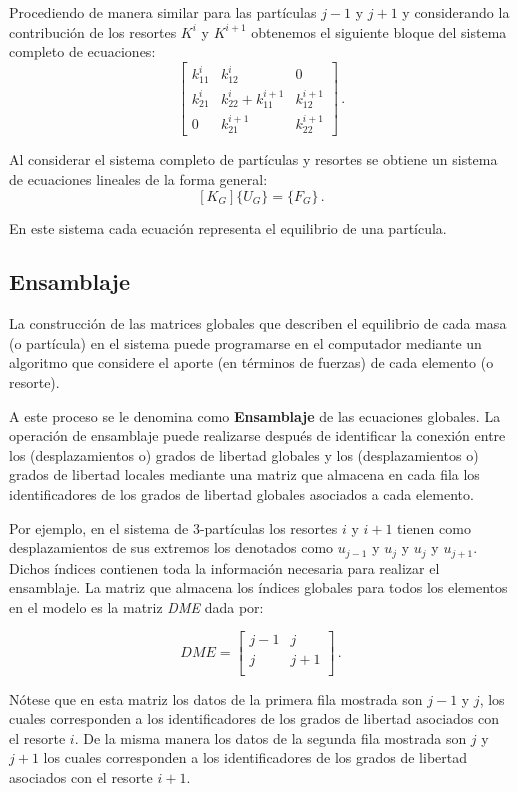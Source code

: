 Procediendo de manera similar para las partículas ${j-1}$ y ${j+1}$ y 
considerando la contribución de los resortes $K^i$ y $K^{i+1}$ obtenemos el 
siguiente bloque del sistema completo de ecuaciones:
$$\begin{bmatrix}
k_{11}^i &k_{12}^i &0\\
k_{21}^i &k_{22}^i + k_{11}^{i + 1} &k_{12}^{i + 1}\\
0 &k_{21}^{i + 1} &k_{22}^{i + 1}
\end{bmatrix}\, . $$

Al considerar el sistema completo de partículas y resortes se obtiene un 
sistema de ecuaciones lineales de la forma general:
$$
[K_G] \{U_G\}  = \{F_G\}\, .
$$

En este sistema cada ecuación representa el equilibrio de una partícula.

\subsection{Ensamblaje}
La construcción de las matrices globales que describen el equilibrio de cada 
masa (o partícula) en el sistema puede programarse en el computador mediante un 
algoritmo que considere el aporte (en términos de fuerzas) de cada elemento (o 
resorte).

A este proceso se le denomina como \textbf{Ensamblaje} de las ecuaciones 
globales. La operación de ensamblaje puede realizarse después de identificar la 
conexión entre los (desplazamientos o) grados de libertad globales y los 
(desplazamientos o) grados de libertad locales mediante una matriz que almacena 
en cada fila los identificadores de los grados de libertad globales asociados a 
cada elemento.

Por ejemplo, en el sistema de 3-partículas los resortes $i$ y $i+1$ tienen como 
desplazamientos de sus extremos los denotados como $u_{j-1}$ y $u_j$ y $u_j$ y 
$u_{j+1}$. Dichos índices contienen toda la información necesaria para realizar 
el ensamblaje. La matriz que almacena los índices globales para todos los 
elementos en el modelo es la matriz \textit{DME} dada por:

$$ DME = \begin{bmatrix}
j - 1 &j\\
j &j + 1\\
\end{bmatrix}\, .$$

Nótese que en esta matriz los datos de la primera fila mostrada son $j - 1$ y 
$j$, los cuales corresponden a los identificadores de los grados de libertad 
asociados con el resorte $i$. De la misma manera los datos de la segunda fila 
mostrada son $j$ y $j+1$ los cuales corresponden a los identificadores de los 
grados de libertad asociados con el resorte $i+1$.

